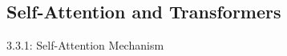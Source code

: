 
\vspace*{1em}
\subsection{Self-Attention and Transformers}
\label{ex:3.3}


\begin{task}{3.3.1: Self-Attention Mechanism}
\end{task}

